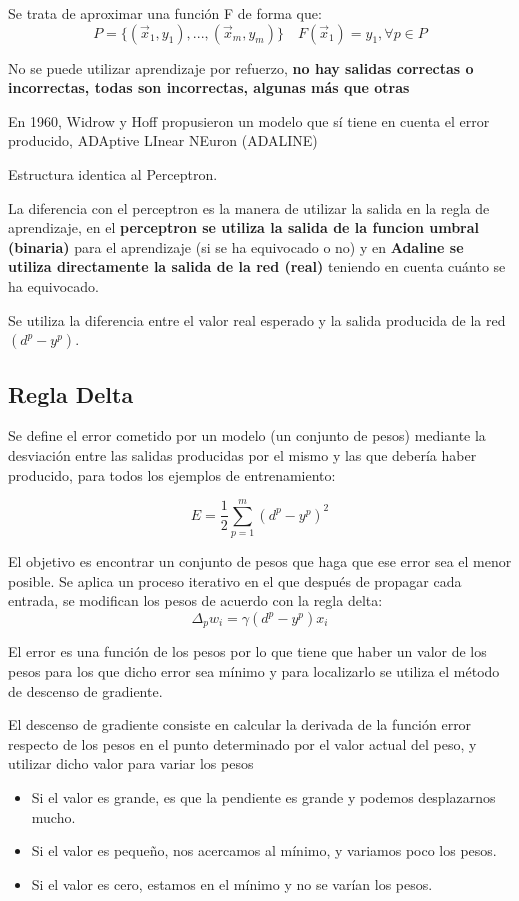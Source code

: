 \documentclass[12pt, twoside, openright]{report} %
\begin{document}
Se trata de aproximar una función F de forma que:
$$P=\{(\vec{x}_1, y_1), ...,(\vec{x}_m, y_m)\} \quad F(\vec{x}_1)=y_1, \forall p \in P$$

No se puede utilizar aprendizaje por refuerzo, \textbf{no hay salidas correctas o incorrectas, todas son incorrectas, algunas más que otras}

En 1960, Widrow y Hoff propusieron un modelo que sí tiene en cuenta el error producido, ADAptive LInear NEuron (ADALINE)

Estructura identica al Perceptron.

La diferencia con el perceptron es la manera de utilizar la salida en la regla de aprendizaje, en el \textbf{perceptron se utiliza la salida de la funcion umbral (binaria)} para el aprendizaje (si se ha equivocado o no) y en \textbf{Adaline se utiliza directamente la salida de la red (real)} teniendo en cuenta cuánto se ha equivocado.

Se utiliza la diferencia entre el valor real esperado y la salida producida de la red $(d^p-y^p)$.

\subsection{Regla Delta}
Se define el error cometido por un modelo (un conjunto de pesos) mediante la desviación entre las salidas producidas por el mismo y las que debería haber producido, para todos los ejemplos de entrenamiento:

$$E=\frac 1 2 \sum_{p=1}^m(d^p-y^p)^2$$

El objetivo es encontrar un conjunto de pesos que haga que ese error sea el menor posible. Se aplica un proceso iterativo en el que después de propagar cada entrada, se modifican los pesos de acuerdo con la regla delta:
$$\Delta_pw_i=\gamma(d^p-y^p)x_i$$

El error es una función de los pesos por lo que tiene que haber un valor de los pesos para los que dicho error sea mínimo y para localizarlo se utiliza el método de descenso de gradiente.

El descenso de gradiente consiste en calcular la derivada de la función error respecto de los pesos en el punto determinado por el valor actual del peso, y utilizar dicho valor para variar los pesos
\begin{itemize}
	\item Si el valor es grande, es que la pendiente es grande y podemos desplazarnos mucho.
	\item Si el valor es pequeño, nos acercamos al mínimo, y variamos poco los pesos.
	\item Si el valor es cero, estamos en el mínimo y no se varían los pesos.
\end{itemize}
\end{document}
